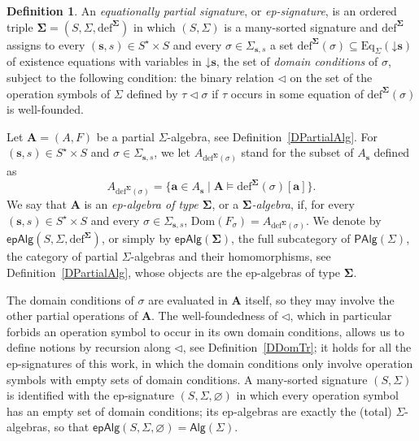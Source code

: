 \documentclass{amsart}
\newcommand{\vs}[1]{\mathbin{\downarrow}#1}
\theoremstyle{plain}
\theoremstyle{definition}
\newtheorem{definition}[theorem]{Definition}
\begin{document}
\begin{definition}\label{DEpSignature}
An \emph{equationally partial signature}, or \emph{ep-signature}, is an ordered triple $\mathbf{\Sigma}=(S,\Sigma,\mathrm{def}^{\mathbf{\Sigma}})$ in which $(S,\Sigma)$ is a many-sorted signature and $\mathrm{def}^{\mathbf{\Sigma}}$ assigns to every $(\mathbf{s},s)\in S^{\star}\times S$ and every $\sigma\in\Sigma_{\mathbf{s},s}$ a set $\mathrm{def}^{\mathbf{\Sigma}}(\sigma)\subseteq\mathrm{Eq}_{\Sigma}(\vs{\mathbf{s}})$ of existence equations with variables in $\vs{\mathbf{s}}$, the set of \emph{domain conditions} of $\sigma$, subject to the following condition: the binary relation $\lhd$ on the set of the operation symbols of $\Sigma$ defined by $\tau\lhd\sigma$ if $\tau$ occurs in some equation of $\mathrm{def}^{\mathbf{\Sigma}}(\sigma)$ is well-founded.

Let $\mathbf{A}=(A,F)$ be a partial $\Sigma$-algebra, see Definition~\ref{DPartialAlg}. For $(\mathbf{s},s)\in S^{\star}\times S$ and $\sigma\in\Sigma_{\mathbf{s},s}$, we let $A_{\mathrm{def}^{\mathbf{\Sigma}}(\sigma)}$ stand for the subset of $A_{\mathbf{s}}$ defined as
$$
A_{\mathrm{def}^{\mathbf{\Sigma}}(\sigma)}=\{\mathbf{a}\in A_{\mathbf{s}}\mid\mathbf{A}\models\mathrm{def}^{\mathbf{\Sigma}}(\sigma)[\mathbf{a}]\}.
$$
We say that $\mathbf{A}$ is an \emph{ep-algebra of type $\mathbf{\Sigma}$}, or a \emph{$\mathbf{\Sigma}$-algebra}, if, for every $(\mathbf{s},s)\in S^{\star}\times S$ and every $\sigma\in\Sigma_{\mathbf{s},s}$, $\mathrm{Dom}(F_{\sigma})=A_{\mathrm{def}^{\mathbf{\Sigma}}(\sigma)}$. We denote by $\mathsf{epAlg}(S,\Sigma,\mathrm{def}^{\mathbf{\Sigma}})$, or simply by $\mathsf{epAlg}(\mathbf{\Sigma})$, the full subcategory of $\mathsf{PAlg}(\Sigma)$, the category of partial $\Sigma$-algebras and their homomorphisms, see Definition~\ref{DPartialAlg}, whose objects are the ep-algebras of type $\mathbf{\Sigma}$.
\end{definition}

The domain conditions of $\sigma$ are evaluated in $\mathbf{A}$ itself, so they may involve the other partial operations of $\mathbf{A}$. The well-foundedness of $\lhd$, which in particular forbids an operation symbol to occur in its own domain conditions, allows us to define notions by recursion along $\lhd$, see Definition~\ref{DDomTr}; it holds for all the ep-signatures of this work, in which the domain conditions only involve operation symbols with empty sets of domain conditions. A many-sorted signature $(S,\Sigma)$ is identified with the ep-signature $(S,\Sigma,\varnothing)$ in which every operation symbol has an empty set of domain conditions; its ep-algebras are exactly the (total) $\Sigma$-algebras, so that $\mathsf{epAlg}(S,\Sigma,\varnothing)=\mathsf{Alg}(\Sigma)$.
\end{document}
